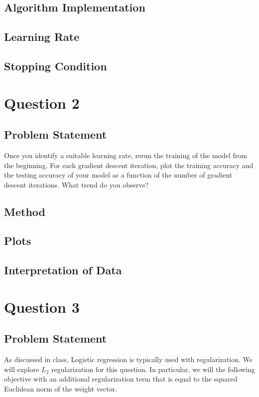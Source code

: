 \documentclass[letterpaper,10pt]{article}
\begin{document}
\subsection{Algorithm Implementation}
\subsection{Learning Rate}

\subsection{Stopping Condition}

\section{Question 2}
\subsection{Problem Statement}
Once you identify a suitable learning rate, rerun the training of the model from the beginning. For 
each gradient descent iteration, plot the training accuracy and the testing accuracy of your model 
as a function of the number of gradient descent iterations. What trend do you observe?

\subsection{Method}
\subsection{Plots}
\subsection{Interpretation of Data}

\section{Question 3}
\subsection{Problem Statement}
As discussed in class, Logistic regression is typically used with regularization. We will explore 
\(L_2\) regularization for this question. In particular, we will the following objective with an 
additional regularization term that is equal to the squared Euclidean norm of the weight vector.
\end{document}
